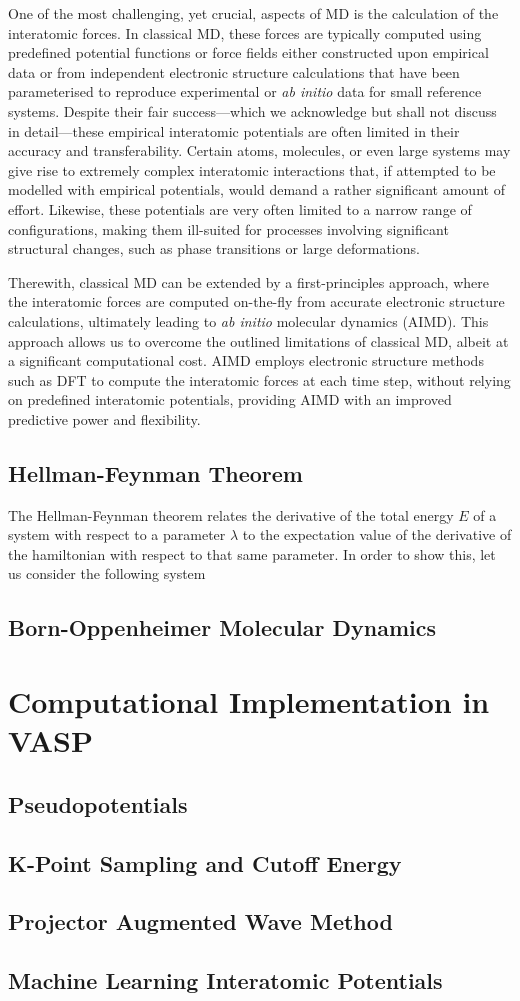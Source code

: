 One of the most challenging, yet crucial, aspects of MD is the calculation of the interatomic forces. In classical MD, these forces are typically computed using predefined potential functions or force fields either constructed upon empirical data or from independent electronic structure calculations that have been parameterised to reproduce experimental or \emph{ab initio} data for small reference systems. Despite their fair success---which we acknowledge but shall not discuss in detail---these empirical interatomic potentials are often limited in their accuracy and transferability. Certain atoms, molecules, or even large systems may give rise to extremely complex interatomic interactions that, if attempted to be modelled with empirical potentials, would demand a rather significant amount of effort. Likewise, these potentials are very often limited to a narrow range of configurations, making them ill-suited for processes involving significant structural changes, such as phase transitions or large deformations.  

Therewith, classical MD can be extended by a first-principles approach, where the interatomic forces are computed on-the-fly from accurate electronic structure calculations, ultimately leading to \emph{ab initio} molecular dynamics (AIMD). This approach allows us to overcome the outlined limitations of classical MD, albeit at a significant computational cost. AIMD employs electronic structure methods such as DFT to compute the interatomic forces at each time step, without relying on predefined interatomic potentials, providing AIMD with an improved predictive power and flexibility.  


\subsection{Hellman-Feynman Theorem}
 The Hellman-Feynman theorem\supercite{Feynman1939, Politzer2018} relates the derivative of the total energy $E$ of a system with respect to a parameter $\lambda$ to the expectation value of the derivative of the hamiltonian with respect to that same parameter. In order to show this, let us consider the following system 

\subsection{Born-Oppenheimer Molecular Dynamics}


\section{Computational Implementation in VASP}
\subsection{Pseudopotentials}
\subsection{K-Point Sampling and Cutoff Energy}
\subsection{Projector Augmented Wave Method}
\subsection{Machine Learning Interatomic Potentials}



